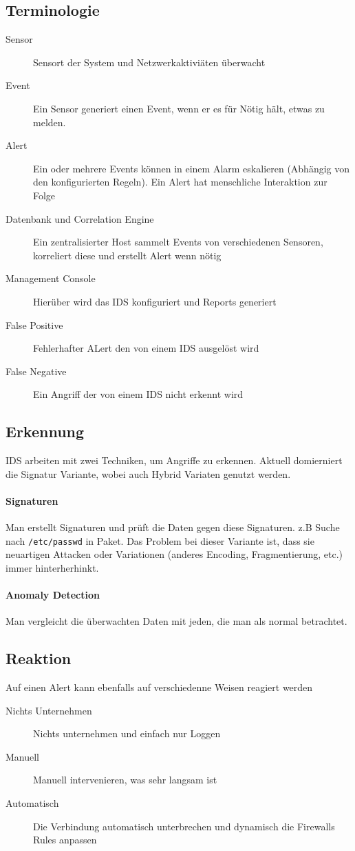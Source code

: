 \subsection{Terminologie}
\begin{description}
	\item[Sensor] Sensort der System und Netzwerkaktiviäten überwacht
	\item[Event] Ein Sensor generiert einen Event, wenn er es für Nötig hält, etwas zu melden.
	\item[Alert] Ein oder mehrere Events können in einem Alarm eskalieren (Abhängig von den konfigurierten Regeln). Ein Alert hat menschliche Interaktion zur Folge
	\item[Datenbank und Correlation Engine] Ein zentralisierter Host sammelt Events von verschiedenen Sensoren, korreliert diese und erstellt Alert wenn nötig
	\item[Management Console] Hierüber wird das IDS konfiguriert und Reports generiert
	\item[False Positive] Fehlerhafter ALert den von einem IDS ausgelöst wird
	\item[False Negative] Ein Angriff der von einem IDS nicht erkennt wird
\end{description}

\subsection{Erkennung}
IDS arbeiten mit zwei Techniken, um Angriffe zu erkennen. Aktuell domierniert die Signatur Variante, wobei auch Hybrid Variaten genutzt werden.

\paragraph{Signaturen}
Man erstellt Signaturen und prüft die Daten gegen diese Signaturen. z.B Suche nach \lstinline|/etc/passwd| in Paket. Das Problem bei dieser Variante ist, dass sie neuartigen Attacken oder Variationen (anderes Encoding, Fragmentierung, etc.) immer hinterherhinkt.

\paragraph{Anomaly Detection}
Man vergleicht die überwachten Daten mit jeden, die man als normal betrachtet.

\subsection{Reaktion}
Auf einen Alert kann ebenfalls auf verschiedenne Weisen reagiert werden
\begin{description}
	\item[Nichts Unternehmen] Nichts unternehmen und einfach nur Loggen
	\item[Manuell] Manuell intervenieren, was sehr langsam ist
	\item[Automatisch] Die Verbindung automatisch unterbrechen und dynamisch die Firewalls Rules anpassen
\end{description}


